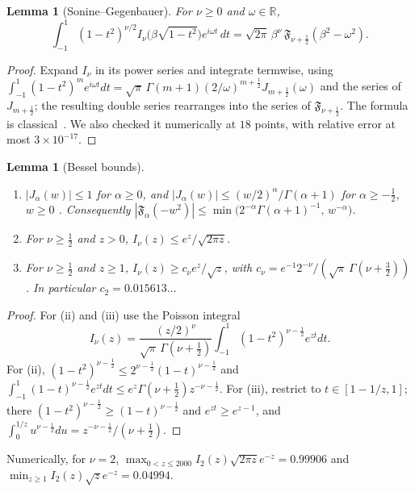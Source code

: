 \documentclass[11pt]{amsart}
\newtheorem{lemma}[proposition]{Lemma}
\theoremstyle{definition}
\theoremstyle{remark}
\numberwithin{equation}{section}
\newcommand{\R}{\mathbb{R}}
\newcommand{\F}{\mathfrak{F}}
\begin{document}
\begin{lemma}[Sonine--Gegenbauer]\label{lem:SG}
For $\nu\ge0$ and $\omega\in\R$,
\[
\int_{-1}^1(1-t^2)^{\nu/2}I_\nu\big(\beta\sqrt{1-t^2}\big)e^{i\omega t}\,dt=\sqrt{2\pi}\,\beta^\nu\,\F_{\nu+\frac12}(\beta^2-\omega^2).
\]
\end{lemma}
\begin{proof}
Expand $I_\nu$ in its power series and integrate termwise, using $\int_{-1}^1(1-t^2)^me^{i\omega t}dt=\sqrt\pi\,\Gamma(m+1)(2/\omega)^{m+\frac12}J_{m+\frac12}(\omega)$ and the series of $J_{m+\frac12}$; the resulting double series rearranges into the series of $\F_{\nu+\frac12}$. The formula is classical~\cite[Ch.~XII]{Watson}. We also checked it numerically at $18$ points, with relative error at most $3\times10^{-17}$.
\end{proof}

\begin{lemma}[Bessel bounds]\label{lem:bessel}
\begin{enumerate}
\item[(i)] $|J_\alpha(w)|\le1$ for $\alpha\ge0$, and $|J_\alpha(w)|\le(w/2)^\alpha/\Gamma(\alpha+1)$ for $\alpha\ge-\frac12$, $w\ge0$ \cite[10.14.1, 10.14.4]{DLMF}. Consequently $|\F_\alpha(-w^2)|\le\min\big(2^{-\alpha}\Gamma(\alpha+1)^{-1},\,w^{-\alpha}\big)$.
\item[(ii)] For $\nu\ge\frac12$ and $z>0$, $I_\nu(z)\le e^z/\sqrt{2\pi z}$.
\item[(iii)] For $\nu\ge\frac12$ and $z\ge1$, $I_\nu(z)\ge c_\nu e^z/\sqrt z$, with $c_\nu=e^{-1}2^{-\nu}/(\sqrt\pi\,\Gamma(\nu+\frac32))$. In particular $c_2=0.015613\ldots$
\end{enumerate}
\end{lemma}
\begin{proof}
For (ii) and (iii) use the Poisson integral
\[
I_\nu(z)=\frac{(z/2)^\nu}{\sqrt\pi\,\Gamma(\nu+\frac12)}\int_{-1}^1(1-t^2)^{\nu-\frac12}e^{zt}dt .
\]
For (ii), $(1-t^2)^{\nu-\frac12}\le2^{\nu-\frac12}(1-t)^{\nu-\frac12}$ and $\int_{-1}^1(1-t)^{\nu-\frac12}e^{zt}dt\le e^z\Gamma(\nu+\frac12)z^{-\nu-\frac12}$. For (iii), restrict to $t\in[1-1/z,1]$; there $(1-t^2)^{\nu-\frac12}\ge(1-t)^{\nu-\frac12}$ and $e^{zt}\ge e^{z-1}$, and $\int_0^{1/z}u^{\nu-\frac12}du=z^{-\nu-\frac12}/(\nu+\frac12)$.
\end{proof}
Numerically, for $\nu=2$, $\max_{0<z\le2000}I_2(z)\sqrt{2\pi z}e^{-z}=0.99906$ and $\min_{z\ge1}I_2(z)\sqrt ze^{-z}=0.04994$.
\end{document}
